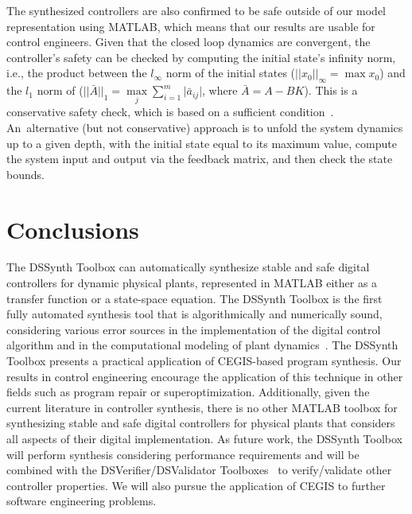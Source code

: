 \documentclass[conference]{IEEEtran}
\newcommand\tool{{DSSynth Toolbox}\xspace}
\begin{document}

The synthesized controllers are also confirmed to be safe outside of our
model representation using MATLAB, which means that our results are usable
for control engineers.  Given that the closed loop dynamics are convergent,
the controller's safety can be checked by computing the initial state's
infinity norm, i.e., the product between the $l_{\infty}$ norm of the
initial states ($\vert\vert{x_{0}}\vert\vert_{\infty}=\max{x_{0}}$) and the
$l_{1}$ norm of
($\vert\vert{\bar{A}}\vert\vert_{1}=\max\limits_{j}{\sum\limits_{i=1}^{m}
\vert \bar{a}_{ij} \vert}$, where $\bar{A}=A-BK$).  This is a conservative
safety check, which is based on a sufficient
condition~\cite{toscano2013structured}.  An~alternative (but not
conservative) approach is to unfold the system dynamics up to a given depth,
with the initial state equal to its maximum value, compute the system input
and output via the feedback matrix, and then check the state bounds.


\section{Conclusions}

The \tool can automatically synthesize stable and safe digital controllers
for dynamic physical plants, represented in MATLAB either as a
transfer function or a state-space equation.  The \tool is the first fully
automated synthesis tool that is algorithmically and numerically sound,
considering various error sources in the implementation of the digital
control algorithm and in the computational modeling of plant
dynamics~\cite{abate2017, abatecav2017}.
%
The \tool presents a practical application of CEGIS-based program synthesis.
Our results in control engineering encourage the application
of this technique in other fields such as program repair or superoptimization.
%
Additionally, given the current literature in controller synthesis, there is
no other MATLAB toolbox for synthesizing stable and safe digital controllers
for physical plants that considers all aspects of their digital
implementation.
%
As future work, the \tool will perform synthesis considering performance
requirements and will be combined with the
DSVerifier/DSValidator Toolboxes~\cite{issta2017,dsvalidator} to
verify/validate other controller properties.
We will also pursue the application of CEGIS to further software
engineering problems.


 
\end{document}
